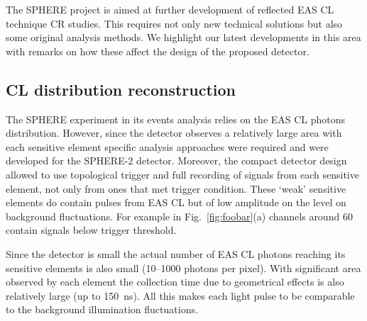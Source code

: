 \documentclass[a4paper,11pt]{article}
\begin{document}
The SPHERE project is aimed at further development of reflected EAS CL technique CR studies. This requires not only new technical solutions but also some original analysis methods. We highlight our latest developments in this area with remarks on how these affect the design of the proposed detector.

\subsection{CL distribution reconstruction}

The SPHERE experiment in its events analysis relies on the EAS CL photons distribution. However, since the detector observes a relatively large area with each sensitive element specific analysis approaches were required and were developed for the SPHERE-2 detector. Moreover, the compact detector design allowed to use topological trigger and full recording of signals from each sensitive element, not only from ones that met trigger condition. These `weak' sensitive elements do contain pulses from EAS CL but of low amplitude on the level on background fluctuations. For example in Fig.~\ref{fig:foobar}(a) channels around 60 contain signals below trigger threshold. 

Since the detector is small the actual number of EAS CL photons reaching its sensitive elements is also small (10--1000 photons per pixel). With significant area observed by each element the collection time due to geometrical effects is also relatively large (up to 150~ns). All this makes each light pulse to be comparable to the background illumination fluctuations. 


\end{document}
